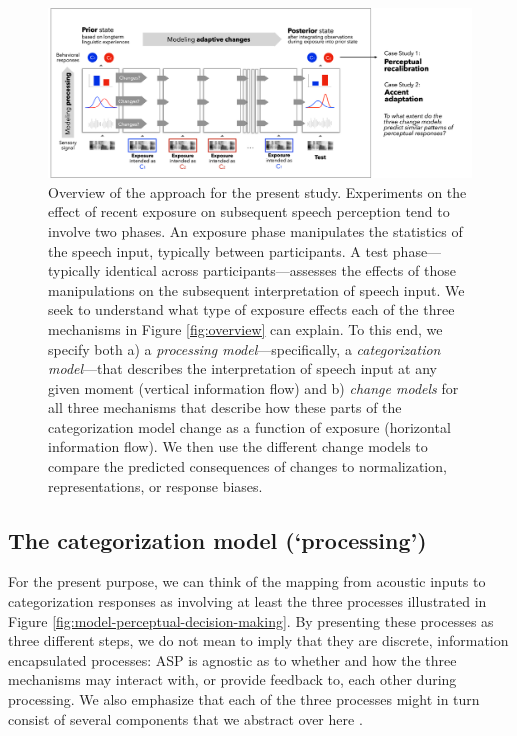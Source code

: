 \documentclass[
  11pt,
  man,floatsintext]{apa6}
\begin{document}
\begin{figure}[h]
\begin{center}
\includegraphics[width=.99\columnwidth]{../figures/diagrams/overview-of-changes.png}
\caption{Overview of the approach for the present study. Experiments on the effect of recent exposure on subsequent speech perception tend to involve two phases. An exposure phase manipulates the statistics of the speech input, typically between participants. A test phase---typically identical across participants---assesses the effects of those manipulations on the subsequent interpretation of speech input. We seek to understand what type of exposure effects each of the three mechanisms in Figure \ref{fig:overview} can explain. To this end, we specify both a) a {\em processing model}---specifically, a {\em categorization model}---that describes the interpretation of speech input at any given moment (vertical information flow) and b) {\em change models} for all three mechanisms that describe how these parts of the categorization model change as a function of exposure (horizontal information flow). We then use the different change models to compare the predicted consequences of changes to normalization, representations, or response biases.}\label{fig:overview-change}
\end{center}
\end{figure}

\hypertarget{the-categorization-model-processing}{%
\subsection{The categorization model (`processing')}\label{the-categorization-model-processing}}

For the present purpose, we can think of the mapping from acoustic inputs to categorization responses as involving at least the three processes illustrated in Figure \ref{fig:model-perceptual-decision-making}. By presenting these processes as three different steps, we do not mean to imply that they are discrete, information encapsulated processes: ASP is agnostic as to whether and how the three mechanisms may interact with, or provide feedback to, each other during processing. We also emphasize that each of the three processes might in turn consist of several components that we abstract over here \autocite[e.g., multiple different levels of normalization, cf.~discussion in][]{barreda2020}.
\end{document}
